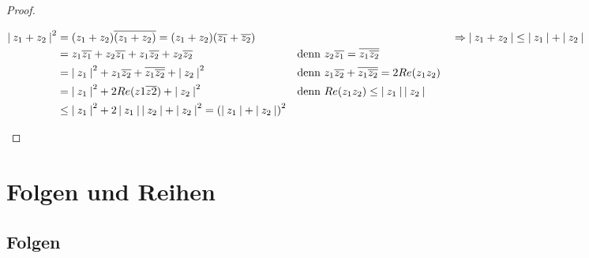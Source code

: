 \documentclass[a4paper,titlepage,oneside]{article}
\newcommand{\abs}[1]{\ensuremath{\left|\:#1\:\right|}}
\theoremstyle{thmstyle}
\begin{document}
\begin{prop}
\begin{proof}
\begin{enumerate}[label=(\roman*)]
\begin{math}
\begin{aligned}[t]
\end{aligned}\\
\begin{aligned}[t]
\abs{z_1 + z_2}^2 &= (z_1 + z_2)\overline{(z_1 + z_2)} = (z_1 + z_2)(\overline{z_1} + \overline{z_2}) \\
&= z_1\overline{z_1} + z_2\overline{z_1} + z_1\overline{z_2} + z_2\overline{z_2} &&\text{denn } z_2\overline{z_1} = \overline{z_1\overline{z_2}} \\
&= \abs{z_1}^2 + z_1\overline{z_2} + \overline{z_1\overline{z_2}} + \abs{z_2}^2 &&\text{denn } z_1\overline{z_2} + \overline{z_1\overline{z_2}} = 2Re(z_1z_2) \\
&= \abs{z_1}^2 + 2 Re(z1 \overline{z2}) + \abs{z_2}^2 &&\text{denn } Re(z_1z_2) \le \abs{z_1}\abs{z_2}\\
&\le  \abs{z_1}^2 + 2\abs{z_1}\abs{z_2} + \abs{z_2}^2 = \left(\abs{z_1} + \abs{z_2}\right)^2
\end{aligned}\\
\Rightarrow \abs{z_1 + z_2} \le \abs{z_1} + \abs{z_2}
\end{math}
\end{enumerate}
\end{proof}
\end{prop}

\newpage
\section{Folgen und Reihen}
\subsection{Folgen}
\end{document}

